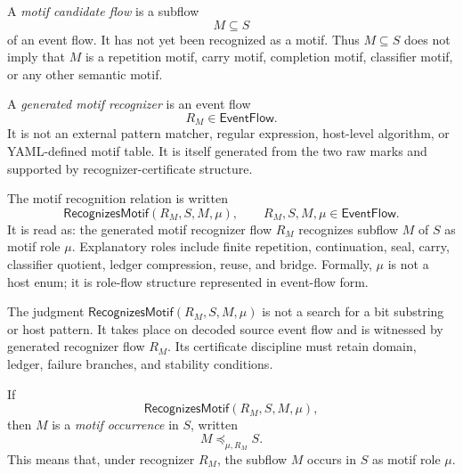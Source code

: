 \begin{definition}
\label{def:motif-generated-candidate-flow}
A \emph{motif candidate flow} is a subflow
$$
  M\subseteq S
$$
of an event flow. It has not yet been recognized as a motif. Thus $M\subseteq S$ does not imply that $M$ is a repetition motif, carry motif, completion motif, classifier motif, or any other semantic motif.
\end{definition}

\begin{definition}
\label{def:motif-generated-recognizer}
A \emph{generated motif recognizer} is an event flow
$$
  R_M\in\mathsf{EventFlow}.
$$
It is not an external pattern matcher, regular expression, host-level algorithm, or YAML-defined motif table. It is itself generated from the two raw marks and supported by recognizer-certificate structure.
\end{definition}

\begin{definition}
\label{def:motif-generated-recognition-relation}
The motif recognition relation is written
$$
  \mathsf{RecognizesMotif}(R_M,S,M,\mu),
  \qquad
  R_M,S,M,\mu\in\mathsf{EventFlow}.
$$
It is read as: the generated motif recognizer flow $R_M$ recognizes subflow $M$ of $S$ as motif role $\mu$. Explanatory roles include finite repetition, continuation, seal, carry, classifier quotient, ledger compression, reuse, and bridge. Formally, $\mu$ is not a host enum; it is role-flow structure represented in event-flow form.
\end{definition}

\begin{remark}
\label{rem:motif-generated-not-regex}
The judgment $\mathsf{RecognizesMotif}(R_M,S,M,\mu)$ is not a search for a bit substring or host pattern. It takes place on decoded source event flow and is witnessed by generated recognizer flow $R_M$. Its certificate discipline must retain domain, ledger, failure branches, and stability conditions.
\end{remark}

\begin{definition}
\label{def:motif-generated-occurrence}
If
$$
  \mathsf{RecognizesMotif}(R_M,S,M,\mu),
$$
then $M$ is a \emph{motif occurrence} in $S$, written
$$
  M\preceq_{\mu,R_M}S.
$$
This means that, under recognizer $R_M$, the subflow $M$ occurs in $S$ as motif role $\mu$.
\end{definition}

